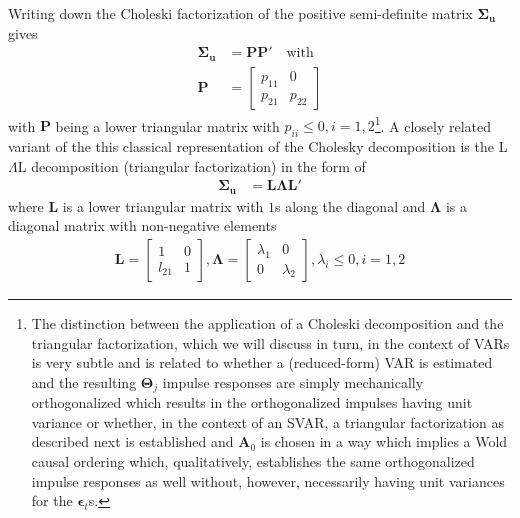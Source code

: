 \documentclass[a4paper,11pt,listof=nochaptergap,oneside,pointednumbers,bibtotoc,bigheadings,liststotoc,hidelinks]{scrbook}
\theoremstyle{mysatz}
\theoremstyle{mydefinition}
\theoremstyle{mytheorem}
\theoremstyle{mybemerkung}
\newcommand{\vect}[1]{\boldsymbol{\mathbf{#1}}}
\begin{document}
Writing down the Choleski factorization of the positive semi-definite matrix $\vect{\Sigma_u}$ gives
\begin{equation} \label{eq:svar14}
\begin{split}
 		\vect{\Sigma_u} & = \vect{P}\vect{P'} \quad \text{with} \\
		\vect{P} & = \begin{bmatrix}
    							p_{11} & 0 \\
							p_{21} & p_{22}
 							\end{bmatrix}
\end{split}								
\end{equation}
with $\vect{P}$ being a lower triangular matrix with $p_{ii} \leq 0, i = 1, 2$\footnote{The distinction between the application of a Choleski decomposition and the triangular factorization, which we will discuss in turn, in the context of VARs is very subtle and is related to whether a (reduced-form) VAR is estimated and the resulting $\vect{\Theta}_j$ impulse responses are simply mechanically orthogonalized which results in the orthogonalized impulses having unit variance or whether, in the context of an SVAR, a triangular factorization as described next is established and $\vect{A}_0$ is chosen in a way which implies a Wold causal ordering which, qualitatively, establishes the same orthogonalized impulse responses as well without, however, necessarily having unit variances for the $\vect{\epsilon}_t$s.}. A closely related variant of the this classical representation of the Cholesky decomposition is the L$\Lambda$L decomposition (triangular factorization) in the form of 
\begin{equation} \label{eq:svar15}
\begin{split}
 		\vect{\Sigma_u} & = \vect{L}\vect{\Lambda}\vect{L'}
\end{split}								
\end{equation}
where $\vect{L}$ is a lower triangular matrix with $1$s along the diagonal and $\vect{\Lambda}$ is a diagonal matrix with non-negative elements
\begin{equation} \label{eq:svar16}
\begin{split}
	\vect{L} =  \begin{bmatrix}
    				1 & 0 \\
				l_{21} & 1 
 				\end{bmatrix}, 
				\vect{\Lambda} = 
					\begin{bmatrix}
    					\lambda_1 & 0 \\
					0 & \lambda_2 
 					\end{bmatrix},
					\lambda_i \leq 0, i = 1, 2
\end{split}								
\end{equation}
\end{document}
